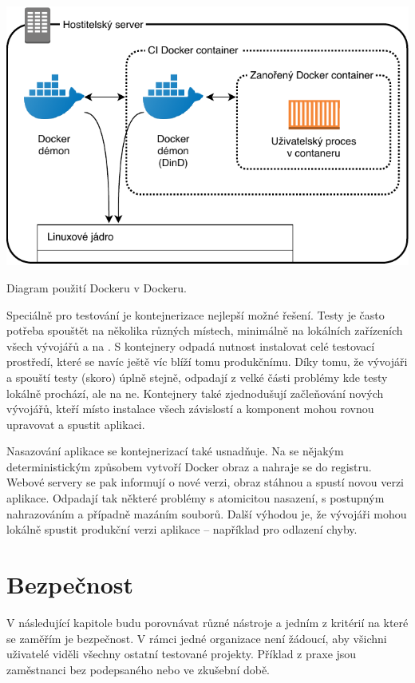         \begin{iffigure}
            \centering
            \includegraphics[width=\textwidth]{media/dind-ci.pdf}
            \caption{Diagram použití Dockeru v Dockeru.}
            \label{fig:dind-ci}
        \end{iffigure}

        Speciálně pro testování je kontejnerizace nejlepší možné řešení. Testy je často potřeba spouštět na několika různých místech, minimálně na lokálních zařízeních všech vývojářů a na \CI. S kontejnery odpadá nutnost instalovat celé testovací prostředí, které se navíc ještě víc blíží tomu produkčnímu. Díky tomu, že vývojáři a \CI spouští testy (skoro) úplně stejně, odpadají z velké části problémy kde testy lokálně prochází, ale na \CI ne. Kontejnery také zjednodušují začleňování nových vývojářů, kteří místo instalace všech závislostí a komponent mohou rovnou upravovat a spustit aplikaci.

        Nasazování aplikace se kontejnerizací také usnadňuje. Na \CI se nějakým deterministickým způsobem vytvoří Docker obraz a nahraje se do registru. Webové servery se pak informují o nové verzi, obraz stáhnou a spustí novou verzi aplikace. Odpadají tak některé problémy s atomicitou nasazení, s postupným nahrazováním a případně mazáním souborů. Další výhodou je, že vývojáři mohou lokálně spustit produkční verzi aplikace -- například pro odlazení chyby.

    \section*{Bezpečnost}
        V následující kapitole budu porovnávat různé \CI nástroje a jedním z kritérií na které se zaměřím je bezpečnost. V rámci jedné organizace není žádoucí, aby všichni uživatelé viděli všechny ostatní testované projekty. Příklad z praxe jsou zaměstnanci bez podepsaného  nebo ve zkušební době.

